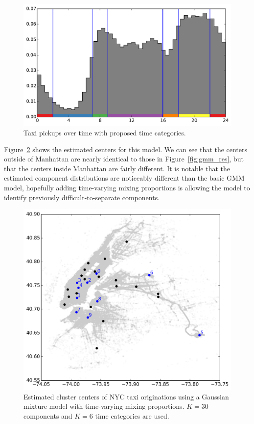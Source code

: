 \documentclass[12pt]{article}
\theoremstyle{definition}
\theoremstyle{algodesc}
\begin{document}
\begin{figure}[tb] \centering
  \includegraphics[width=0.8\linewidth]{./include/time.pdf}
  \caption{Taxi pickups over time with proposed time categories.}
  \label{fig:time}
\end{figure}

Figure~\ref{fig:gmm_cat_res} shows the estimated centers for this model. We can see that the centers outside of Manhattan are nearly identical to those in Figure~\ref{fig:gmm_res}, but that the centers inside Manhattan are fairly different. It is notable that the estimated component distributions are noticeably different than the basic GMM model, hopefully adding time-varying mixing proportions is allowing the model to identify previously difficult-to-separate components.

\begin{figure}[tb] \centering
  \includegraphics[width=0.7\linewidth]{./include/gmm_cat_res.png}
  \caption{Estimated cluster centers of NYC taxi originations using a Gaussian mixture model with time-varying mixing proportions. $K=30$ components and $K=6$ time categories are used.}
  \label{fig:gmm_cat_res}
\end{figure}
\end{document}
